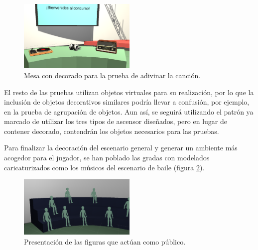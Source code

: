 \begin{figure}
  \centering
    \includegraphics[width=0.5\textwidth]{04.Desarrollo/03.Entrega3/02.Iteracion3_2/00.Figuras/10.unity_3.png}
    \caption{Mesa con decorado para la prueba de adivinar la canción.}
    \label{fig:E3_escenarioCancion}
\end{figure}

El resto de las pruebas utilizan objetos virtuales para su realización, por lo que la inclusión de objetos decorativos similares podría llevar a confusión, por ejemplo, en la prueba de agrupación de objetos. Aun así, se seguirá utilizando el patrón ya marcado de utilizar los tres tipos de ascensor diseñados, pero en lugar de contener decorado, contendrán los objetos necesarios para las pruebas.

Para finalizar la decoración del escenario general y generar un ambiente más acogedor para el jugador, se han poblado las gradas con modelados caricaturizados como los músicos del escenario de baile (figura \ref{fig:E3_escenarioPublico}).


\begin{figure}
  \centering
    \includegraphics[width=0.5\textwidth]{04.Desarrollo/03.Entrega3/02.Iteracion3_2/00.Figuras/11.unity_4.png}
    \caption{Presentación de las figuras que actúan como público.}
    \label{fig:E3_escenarioPublico}
\end{figure}


